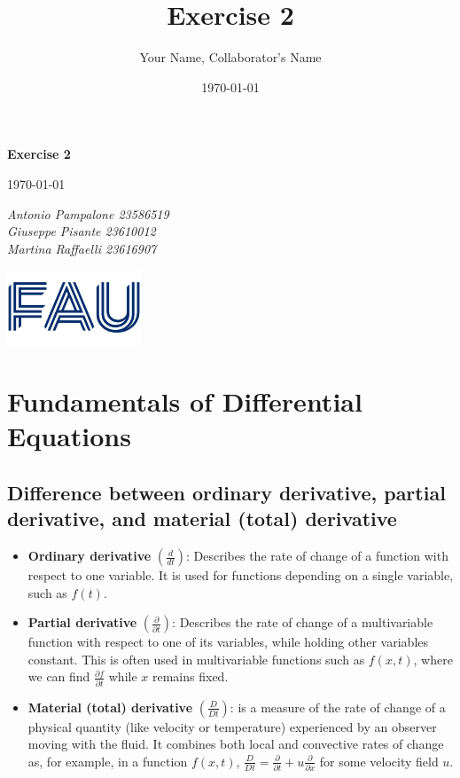 \documentclass{article}
\title{Exercise 2}
\author{Your Name, Collaborator's Name}
\date{\today}
\begin{document}
\begin{titlepage}
    \centering
    \vspace*{1in}
    
    {\Huge\bfseries Exercise 2\par}
    \vspace{1.5cm}
    {\Large \today\par}
    \vspace{1.5cm}
    {\Large\itshape Antonio Pampalone 23586519 \\ Giuseppe Pisante 23610012\\ Martina Raffaelli 23616907 \par}
    
    \vfill
    \includegraphics[width=0.3\textwidth]{FAU-Logo.png}\par\vspace{1cm} %
   
\end{titlepage}

\newpage
\small


\section{Fundamentals of Differential Equations}

\subsection{Difference between ordinary derivative, partial derivative, and material (total) derivative}
\begin{itemize}
    \item \textbf{Ordinary derivative} \( \left( \frac{d}{dt} \right) \): Describes the rate of change of a function with respect to one variable. It is used for functions depending on a single variable, such as \( f(t) \).
    \item \textbf{Partial derivative} \( \left( \frac{\partial}{\partial t} \right) \): Describes the rate of change of a multivariable function with respect to one of its variables, while holding other variables constant. This is often used in multivariable functions such as \( f(x, t) \), where we can find \( \frac{\partial f}{\partial t} \) while \( x \) remains fixed.
    \item \textbf{Material (total) derivative} \( \left( \frac{D}{Dt} \right) \): is a measure of the rate of change of a physical quantity (like velocity or temperature) experienced by an observer moving with the fluid. It combines both local and convective rates of change as, for example, in a function \( f(x, t) \), \( \frac{D}{Dt} = \frac{\partial}{\partial t} + u \frac{\partial}{\partial x} \) for some velocity field \( u \).
\end{itemize}
\end{document}
